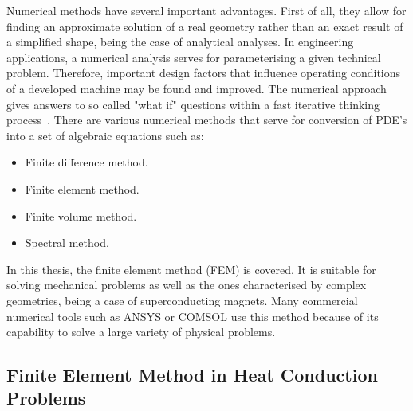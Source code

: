 Numerical methods have several important advantages. First of all, they allow for finding an approximate solution of a real geometry rather than an exact result of a simplified shape, being the case of analytical analyses. In engineering applications, a numerical analysis serves for parameterising a given technical problem. Therefore, important design factors that influence operating conditions of a developed machine may be found and improved. The numerical approach gives answers to so called "what if" questions within a fast iterative thinking process~\cite{heat_transfer_practical_approach_cengel}. There are various numerical methods that serve for conversion of PDE's into a set of algebraic equations such as: 
\begin{itemize}
    \item Finite difference method.
    \item Finite element method.
    \item Finite volume method.
    \item Spectral method.
\end{itemize}

In this thesis, the finite element method (FEM) is covered. It is suitable for solving mechanical problems as well as the ones characterised by complex geometries, being a case of superconducting magnets. Many commercial numerical tools such as ANSYS or COMSOL use this method because of its capability to solve a large variety of physical problems. 

\subsection{Finite Element Method in Heat Conduction Problems}

